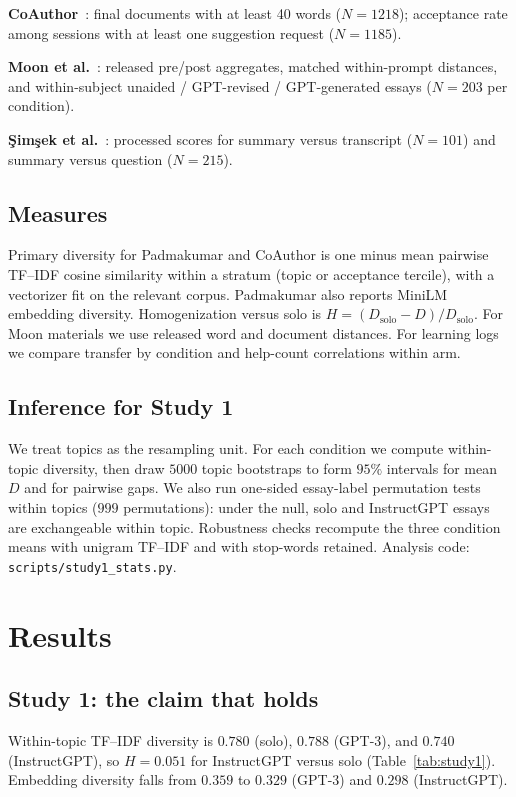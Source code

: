 \documentclass[11pt]{article}
\begin{document}
\textbf{CoAuthor}~\citep{lee2022coauthor}: final documents with at least 40 words ($N=1218$); acceptance rate among sessions with at least one suggestion request ($N=1185$).

\textbf{Moon et al.}~\citep{moon2026disjunction,osfyd94z2026}: released pre/post aggregates, matched within-prompt distances, and within-subject unaided / GPT-revised / GPT-generated essays ($N=203$ per condition).

\textbf{{\c{S}}im{\c{s}}ek et al.}~\citep{simsek2025companion,osfswytk2025}: processed scores for summary versus transcript ($N=101$) and summary versus question ($N=215$).

\subsection{Measures}
Primary diversity for Padmakumar and CoAuthor is one minus mean pairwise TF--IDF cosine similarity within a stratum (topic or acceptance tercile), with a vectorizer fit on the relevant corpus.
Padmakumar also reports MiniLM embedding diversity.
Homogenization versus solo is $H=(D_{\mathrm{solo}}-D)/D_{\mathrm{solo}}$.
For Moon materials we use released word and document distances.
For learning logs we compare transfer by condition and help-count correlations within arm.

\subsection{Inference for Study 1}
We treat topics as the resampling unit.
For each condition we compute within-topic diversity, then draw $5000$ topic bootstraps to form $95\%$ intervals for mean $D$ and for pairwise gaps.
We also run one-sided essay-label permutation tests within topics ($999$ permutations): under the null, solo and InstructGPT essays are exchangeable within topic.
Robustness checks recompute the three condition means with unigram TF--IDF and with stop-words retained.
Analysis code: \texttt{scripts/study1\_stats.py}.

\section{Results}

\subsection{Study 1: the claim that holds}
Within-topic TF--IDF diversity is $0.780$ (solo), $0.788$ (GPT-3), and $0.740$ (InstructGPT), so $H=0.051$ for InstructGPT versus solo (Table~\ref{tab:study1}).
Embedding diversity falls from $0.359$ to $0.329$ (GPT-3) and $0.298$ (InstructGPT).
\end{document}
